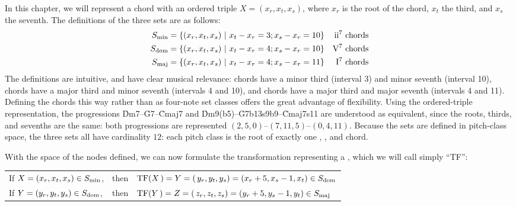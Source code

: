 In this chapter, we will represent a chord with an ordered triple $X = (x_r,
x_t, x_s)$, where $x_r$ is the root of the chord, $x_t$ the third, and $x_s$
the seventh. The definitions of the three sets are as follows:
{\novspace%
\begin{align*}
  \Smin &= \{ (x_r, x_t, x_s)\ |\ x_t - x_r = 3; x_s - x_r = 10 \} &
    \text{\ii chords} \\ %
  \Sdom &= \{ (x_r, x_t, x_s)\ |\ x_t - x_r = 4; x_s - x_r = 10 \} &
    \text{\V chords} \\ %
  \Smaj &= \{ (x_r, x_t, x_s)\ |\ x_t - x_r = 4; x_s - x_r = 11 \} &
    \text{\I chords}
\end{align*}}
%
The definitions are intuitive, and have clear musical relevance: \ii
chords have a minor third (interval 3) and minor seventh (interval 10),
\V chords have a major third and minor seventh (intervals 4 and 10),
and \I chords have a major third and major seventh (intervals 4 and
11). Defining the chords this way rather than as four-note set classes offers
the great advantage of flexibility. Using the ordered-triple representation,
the progressions \h{Dm7}--\h{G7}--\h{Cmaj7} and
\h{Dm9(b5)}--\h{G7b13s9b9}--\h{Cmaj7s11} are understood as equivalent, since
the roots, thirds, and sevenths are the same: both progressions are
represented $(2, 5, 0)$--\allowbreak$(7, 11, 5)$--\allowbreak$(0, 4, 11)$.
Because the sets are defined in pitch-class space, the three sets all have
cardinality $12$: each pitch class is the root of exactly one \ii,
\V, and \I chord.

With the space of the nodes defined, we can now formulate the transformation
representing a \tfo, which we will call simply ``TF'': \\
%
\vspace{0.5\baselineskip}
\begin{tabular}{lcl}
  If $X = (x_r, x_t, x_s) \in S_{\mathrm{min}}$, & then &
    $\mathrm{TF}(X\,) = Y = (\,y_r, y_t, y_s) = (x_r + 5, x_s - 1, x_t) \in S_{\mathrm{dom}}$ \\
%
  If $Y = (y_r, y_t, y_s) \in S_{\mathrm{dom}}$, & then &
    $\mathrm{TF}(Y\,) = Z = (\,z_r, z_t, z_s) = (y_r + 5, y_s - 1, y_t) \in S_{\mathrm{maj}}$
\end{tabular}
\vspace{0.5\baselineskip}

